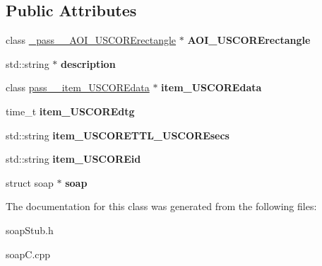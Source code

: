 \subsection*{Public Attributes}
\begin{DoxyCompactItemize}
\item 
\hypertarget{classpass____item_a8461114cf37c47e76b90aff23bd767ff}{
class \hyperlink{class__pass____AOI__USCORErectangle}{\_\-pass\_\-\_\-AOI\_\-USCORErectangle} $\ast$ {\bfseries AOI\_\-USCORErectangle}}
\label{classpass____item_a8461114cf37c47e76b90aff23bd767ff}

\item 
\hypertarget{classpass____item_a6611837c7cc6e1d627ede0be23a638b0}{
std::string $\ast$ {\bfseries description}}
\label{classpass____item_a6611837c7cc6e1d627ede0be23a638b0}

\item 
\hypertarget{classpass____item_a8739cd6160544d57d3442356dc961cd3}{
class \hyperlink{classpass____item__USCOREdata}{pass\_\-\_\-item\_\-USCOREdata} $\ast$ {\bfseries item\_\-USCOREdata}}
\label{classpass____item_a8739cd6160544d57d3442356dc961cd3}

\item 
\hypertarget{classpass____item_a29a4ae1dde17bada2dda3374468994eb}{
time\_\-t {\bfseries item\_\-USCOREdtg}}
\label{classpass____item_a29a4ae1dde17bada2dda3374468994eb}

\item 
\hypertarget{classpass____item_a6f44682917f11f1dd20373a804ce4a27}{
std::string {\bfseries item\_\-USCORETTL\_\-USCOREsecs}}
\label{classpass____item_a6f44682917f11f1dd20373a804ce4a27}

\item 
\hypertarget{classpass____item_acaae4fd890d8615a601ff9c4ae142cec}{
std::string {\bfseries item\_\-USCOREid}}
\label{classpass____item_acaae4fd890d8615a601ff9c4ae142cec}

\item 
\hypertarget{classpass____item_ad153e38e4a7814e1550db217ef5a7693}{
struct soap $\ast$ {\bfseries soap}}
\label{classpass____item_ad153e38e4a7814e1550db217ef5a7693}

\end{DoxyCompactItemize}


The documentation for this class was generated from the following files:\begin{DoxyCompactItemize}
\item 
soapStub.h\item 
soapC.cpp\end{DoxyCompactItemize}
